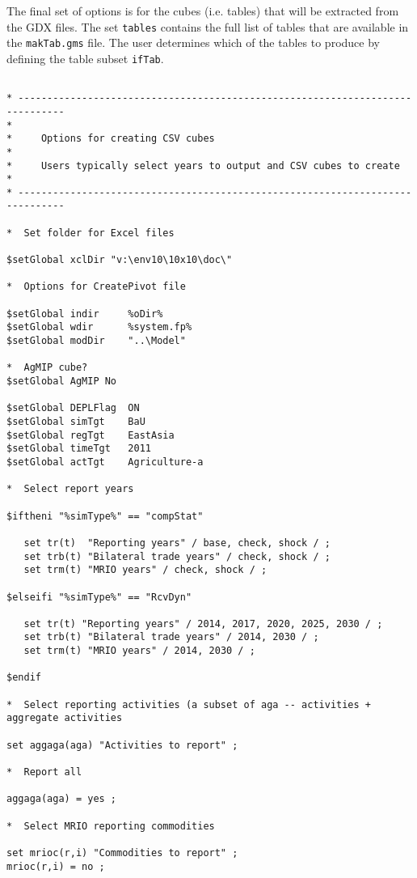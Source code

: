 The final set of options is for the cubes (i.e. tables) that will be extracted from
the GDX files. The set \texttt{tables} contains the full list of tables that are
available in the \texttt{makTab.gms} file. The user determines which of the
tables to produce by defining the table subset \texttt{ifTab}.

\begin{lstlisting}[language=GAMS, caption={'Tab' file example for creating CSV cubes}, label=lst:tabOpt]

* ------------------------------------------------------------------------------
*
*     Options for creating CSV cubes
*
*     Users typically select years to output and CSV cubes to create
*
* ------------------------------------------------------------------------------

*  Set folder for Excel files

$setGlobal xclDir "v:\env10\10x10\doc\"

*  Options for CreatePivot file

$setGlobal indir     %oDir%
$setGlobal wdir      %system.fp%
$setGlobal modDir    "..\Model"

*  AgMIP cube?
$setGlobal AgMIP No

$setGlobal DEPLFlag  ON
$setGlobal simTgt    BaU
$setGlobal regTgt    EastAsia
$setGlobal timeTgt   2011
$setGlobal actTgt    Agriculture-a

*  Select report years

$iftheni "%simType%" == "compStat"

   set tr(t)  "Reporting years" / base, check, shock / ;
   set trb(t) "Bilateral trade years" / check, shock / ;
   set trm(t) "MRIO years" / check, shock / ;

$elseifi "%simType%" == "RcvDyn"

   set tr(t) "Reporting years" / 2014, 2017, 2020, 2025, 2030 / ;
   set trb(t) "Bilateral trade years" / 2014, 2030 / ;
   set trm(t) "MRIO years" / 2014, 2030 / ;

$endif

*  Select reporting activities (a subset of aga -- activities + aggregate activities

set aggaga(aga) "Activities to report" ;

*  Report all

aggaga(aga) = yes ;

*  Select MRIO reporting commodities

set mrioc(r,i) "Commodities to report" ;
mrioc(r,i) = no ;


\end{lstlisting}
